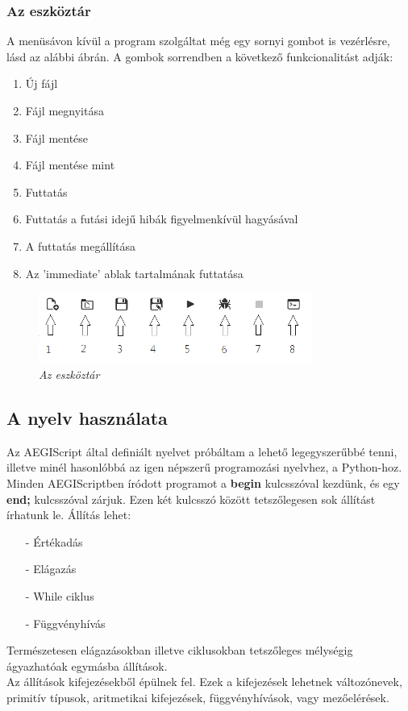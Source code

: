 \documentclass[a4paper,12pt]{report}
\begin{document}
\newpage %

\subsubsection{Az eszköztár}

A menüsávon kívül a program szolgáltat még egy sornyi gombot is vezérlésre, lásd az alábbi ábrán. A gombok sorrendben a következő funkcionalitást adják:
\begin{enumerate}
\item Új fájl
\item Fájl megnyitása
\item Fájl mentése
\item Fájl mentése mint
\item Futtatás
\item Futtatás a futási idejű hibák figyelmenkívül hagyásával
\item A futtatás megállítása
\item Az 'immediate' ablak tartalmának futtatása
\end{enumerate}
\begin{figure}[h]
  \caption{\textit{Az eszköztár}}
  \centering
    \includegraphics[width=0.8\textwidth]{images/gombok.png}
\end{figure}

\subsection{A nyelv használata}
Az AEGIScript által definiált nyelvet próbáltam a lehető legegyszerűbbé tenni, illetve minél hasonlóbbá az igen népszerű programozási nyelvhez, a Python-hoz. \\
Minden AEGIScriptben íródott programot a \textbf{begin} kulcsszóval kezdünk, és egy \textbf{end;} kulcsszóval zárjuk. Ezen két kulcsszó között tetszőlegesen sok állítást írhatunk le. Állítás lehet:
\begin{itemize}
\item[-] Értékadás
\item[-] Elágazás
\item[-] While ciklus
\item[-] Függvényhívás
\end{itemize}
Természetesen elágazásokban illetve ciklusokban tetszőleges mélységig ágyazhatóak egymásba állítások. \\
Az állítások kifejezésekből épülnek fel. Ezek a kifejezések lehetnek változónevek, primitív típusok, aritmetikai kifejezések, függvényhívások, vagy mezőelérések. \\
\end{document}
